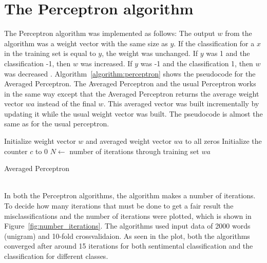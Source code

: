 \section{The Perceptron algorithm}
The Perceptron algorithm was implemented as follows:
The output $w$ from the algorithm was a weight vector with the same size as $y$. If the classification for a $x$ in the training set is equal to $y$, the weight was unchanged.
If $y$ was 1 and the classification -1, then $w$ was increased. If $y$ was -1 and the classification 1, then $w$ was decreased \citep{perceptron_ai}. Algorithm~\ref{algorithm:perceptron} shows the pseudocode for the Averaged Perceptron. The Averaged Perceptron and the usual Perceptron works in the same way except that the Averaged Perceptron returns the average weight vector $wa$ instead of the final $w$.
This averaged vector was built incrementally by updating it while the usual weight vector was built. The pseudocode is almost the same as for the usual perceptron.
\begin{algorithm}[h!]
 \SetAlgoLined
 Initialize weight vector $w$ and averaged weight vector $wa$ to all zeros\;
 Initialize the counter $c$ to 0\;
 $N \leftarrow$ number of iterations through training set\;
 \Return $wa$
 \caption{Averaged Perceptron}
 \label{algorithm:perceptron}
\end{algorithm} \\
In both the Perceptron algorithms, the algorithm makes a number of iterations. To decide how many iterations that must be done to get a fair result the misclassifications and the number of iterations were plotted, which is shown in Figure~\ref{fig:number_iterations}. The algorithms used input data of 2000 words (unigram) and 10-fold crossvalidaion. As seen in the plot, both the algorithms converged after around 15 iterations for both sentimental classification and the classification for different classes. 
